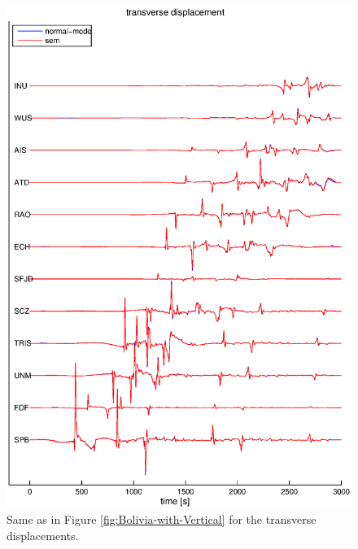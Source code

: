 \documentclass[oneside,english]{book}
\begin{document}
\begin{figure}[ht]
\noindent \begin{centering}
\includegraphics[scale=0.75]{figures/bolivia_trans.eps}\caption{\label{fig:Bolivia-with-Transverse}Same as in Figure \ref{fig:Bolivia-with-Vertical}
for the transverse displacements.}

\par\end{centering}
\end{figure}
\end{document}
